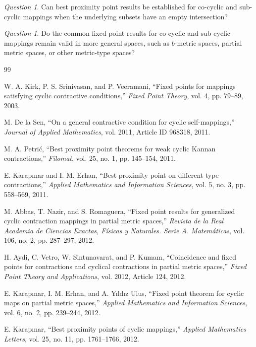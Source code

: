 \documentclass[11pt,a4paper,margin=1in]{amsart}
\theoremstyle{plain}
\theoremstyle{definition}
\theoremstyle{remark}
\newtheorem{question}[theorem]{Question}
\begin{document}
\begin{question}
Can best proximity point results be established for co-cyclic and
sub-cyclic mappings when the underlying subsets have an empty
intersection?
\end{question}

\begin{question}
Do the common fixed point results for co-cyclic and sub-cyclic
mappings remain valid in more general spaces, such as $b$-metric
spaces, partial metric spaces, or other metric-type spaces?
\end{question}
 
\begin{thebibliography}{99}

W. A. Kirk, P. S. Srinivasan, and P. Veeramani,
``Fixed points for mappings satisfying cyclic contractive conditions,''
\emph{Fixed Point Theory}, vol. 4, pp. 79--89, 2003.

M. De la Sen,
``On a general contractive condition for cyclic self-mappings,''
\emph{Journal of Applied Mathematics}, vol. 2011, Article ID 968318, 2011.

M. A. Petrić,
``Best proximity point theorems for weak cyclic Kannan contractions,''
\emph{Filomat}, vol. 25, no. 1, pp. 145--154, 2011.

E. Karapınar and I. M. Erhan,
``Best proximity point on different type contractions,''
\emph{Applied Mathematics and Information Sciences}, vol. 5, no. 3,
pp. 558--569, 2011.

M. Abbas, T. Nazir, and S. Romaguera,
``Fixed point results for generalized cyclic contraction mappings in partial metric spaces,''
\emph{Revista de la Real Academia de Ciencias Exactas, F\'isicas y Naturales.
Serie A. Matem\'aticas}, vol. 106, no. 2, pp. 287--297, 2012.

H. Aydi, C. Vetro, W. Sintunavarat, and P. Kumam,
``Coincidence and fixed points for contractions and cyclical contractions
in partial metric spaces,''
\emph{Fixed Point Theory and Applications}, vol. 2012, Article 124, 2012.

E. Karapınar, I. M. Erhan, and A. Yıldız Ulus,
``Fixed point theorem for cyclic maps on partial metric spaces,''
\emph{Applied Mathematics and Information Sciences}, vol. 6, no. 2,
pp. 239--244, 2012.

E. Karapınar,
``Best proximity points of cyclic mappings,''
\emph{Applied Mathematics Letters}, vol. 25, no. 11,
pp. 1761--1766, 2012.


\end{thebibliography}
\end{document}
